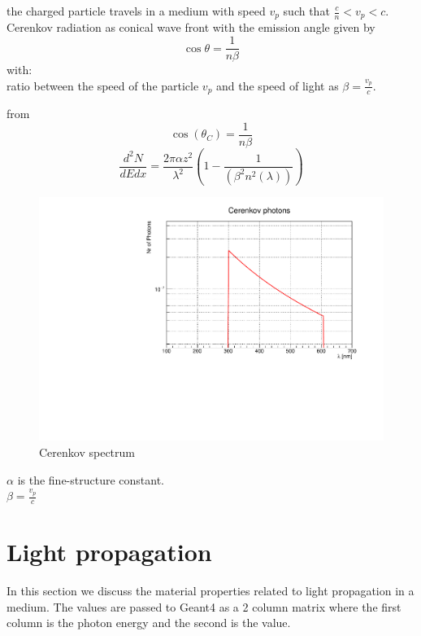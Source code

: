 \documentclass{article}
\begin{document}
the charged particle travels in a medium with speed $v_p$  such that
$\frac{c}{n} < v_p < c$.
 Cerenkov radiation as conical wave front with the emission angle given by 
   \begin{equation}
  \cos \theta ={\frac {1}{n\beta }}
   \end{equation}
  with:\\
   ratio between the speed of the particle $v_p$ and the speed of light as $\beta =\frac{v_p}{c}$.




from \cite{ref:pdg}
\begin{equation}
  \cos(\theta_C)= \frac{1}{n \beta}
  \label{equ:ceren1}
\end{equation}
\begin{equation}
  \frac{d^2N}{dEdx} = \frac{2 \pi \alpha  z^2}  {\lambda^2} \left(1 - \frac{1}{(\beta^2 n^2(\lambda))}\right)
  \label{equ:ceren2}
\end{equation}
\begin{figure}[ht]
\begin{center}
\includegraphics[width=35.5pc]{cerenkov.pdf}
\end{center}
\caption{\label{fig:cerenkov}Cerenkov spectrum}
\end{figure}
$\alpha $ is the fine-structure constant.\\
$\beta = \frac{v_{p}}{c}$

\clearpage
\section{Light propagation}
In this section we discuss the material properties related to light propagation in a medium. The values are 
passed to Geant4 as a 2 column matrix where the first column is the photon energy and the second is the value. 
 
\end{document}
